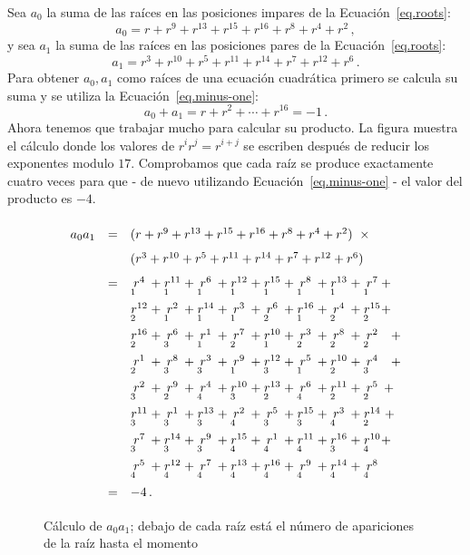 Sea $a_0$ la suma de las raíces en las posiciones impares de la Ecuación~\ref{eq.roots}:
\[
a_0=r + r^9 + r^{13} +r^{15} +r^{16} + r^8+r^4+r^2\,,
\]
y sea $a_1$ la suma de las raíces en las posiciones pares de la Ecuación~\ref{eq.roots}:
\[
a_1=r^3 + r^{10} + r^{5} +r^{11} +r^{14} + r^7+r^{12}+r^6\,.
\]
Para obtener $a_0,a_1$ como raíces de una ecuación cuadrática primero se calcula su suma y se utiliza la Ecuación~\ref{eq.minus-one}:
\[
a_0+a_1=r + r^2 + \cdots +r^{16}=-1\,.
\]
Ahora tenemos que trabajar mucho para calcular su producto. La figura muestra el cálculo donde los valores de $r^ir^j=r^{i+j}$ se escriben después de reducir los exponentes modulo $17$. Comprobamos que cada raíz se produce exactamente cuatro veces para que - de nuevo utilizando Ecuación~\ref{eq.minus-one} - el valor del producto es $-4$.

\begin{figure}[t]
\[
\renewcommand{\arraystretch}{1.6}
\begin{array}{lcl}
a_0a_1&=&(r + r^9 + r^{13} +r^{15} +r^{16} + r^8+r^4+r^2)\;\;\times\\
&&(r^3 + r^{10} + r^{5} +r^{11} +r^{14} + r^7+r^{12}+r^6)\\
&=&\occ{4}{1} + \occ{11}{1} + \occ{6}{1} + \occ{12}{1} + \occ{15}{1} + \occ{8}{1} + \occ{13}{1} + \occ{7}{1} +\\
&&\occ{12}{2} + \occ{2}{1} + \occ{14}{1} + \occ{3}{1} + \occ{6}{2} + \occ{16}{1} + \occ{4}{2} + \occ{15}{2} +\\
&&\occ{16}{2} + \occ{6}{3} + \occ{1}{1} + \occ{7}{2} + \occ{10}{1} + \occ{3}{2} + \occ{8}{2} + \occ{2}{2}\;\;\: +\\
&&\occ{1}{2} + \occ{8}{3} + \occ{3}{3} + \occ{9}{1} + \occ{12}{3} + \occ{5}{1} + \occ{10}{2} + \occ{4}{3}\;\;\: +\\
&&\occ{2}{3} + \occ{9}{2} + \occ{4}{4} + \occ{10}{3} + \occ{13}{2} + \occ{6}{4} + \occ{11}{2} + \occ{5}{2} \:+\\
&&\occ{11}{3} + \occ{1}{3} + \occ{13}{3} + \occ{2}{4} + \occ{5}{3} + \occ{15}{3} + \occ{3}{4} + \occ{14}{2} \;+\\
&&\occ{7}{3} + \occ{14}{3} + \occ{9}{3} + \occ{15}{4} + \occ{1}{4} + \occ{11}{4} + \occ{16}{3} + \occ{10}{4} +\\
&&\occ{5}{4} + \occ{12}{4} + \occ{7}{4} + \occ{13}{4} + \occ{16}{4} + \occ{9}{4} + \occ{14}{4} + \occ{8}{4}\\
&=&-4\,.
\end{array}
\]
\caption{Cálculo de $a_0a_1$; debajo de cada raíz está el número de apariciones de la raíz hasta el momento}\label{fig.a0a1}
\end{figure}

